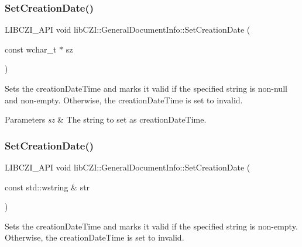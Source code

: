 \subsubsection{\texorpdfstring{Set\+Creation\+Date()}{SetCreationDate()}\hspace{0.1cm}{\footnotesize\ttfamily [1/3]}}
{\footnotesize\ttfamily L\+I\+B\+C\+Z\+I\+\_\+\+A\+PI void lib\+C\+Z\+I\+::\+General\+Document\+Info\+::\+Set\+Creation\+Date (\begin{DoxyParamCaption}\item[{const wchar\+\_\+t $\ast$}]{sz }\end{DoxyParamCaption})\hspace{0.3cm}{\ttfamily [inline]}}

Sets the creation\+Date\+Time and marks it valid if the specified string is non-\/null and non-\/empty. Otherwise, the creation\+Date\+Time is set to invalid.


\begin{DoxyParams}{Parameters}
{\em sz} & The string to set as creation\+Date\+Time. \\
\hline
\end{DoxyParams}
\mbox{\label{structlib_c_z_i_1_1_general_document_info_a2d87d1b828fdd78abdd9562e64424bf8}} 
\subsubsection{\texorpdfstring{Set\+Creation\+Date()}{SetCreationDate()}\hspace{0.1cm}{\footnotesize\ttfamily [2/3]}}
{\footnotesize\ttfamily L\+I\+B\+C\+Z\+I\+\_\+\+A\+PI void lib\+C\+Z\+I\+::\+General\+Document\+Info\+::\+Set\+Creation\+Date (\begin{DoxyParamCaption}\item[{const std\+::wstring \&}]{str }\end{DoxyParamCaption})\hspace{0.3cm}{\ttfamily [inline]}}

Sets the creation\+Date\+Time and marks it valid if the specified string is non-\/empty. Otherwise, the creation\+Date\+Time is set to invalid.



